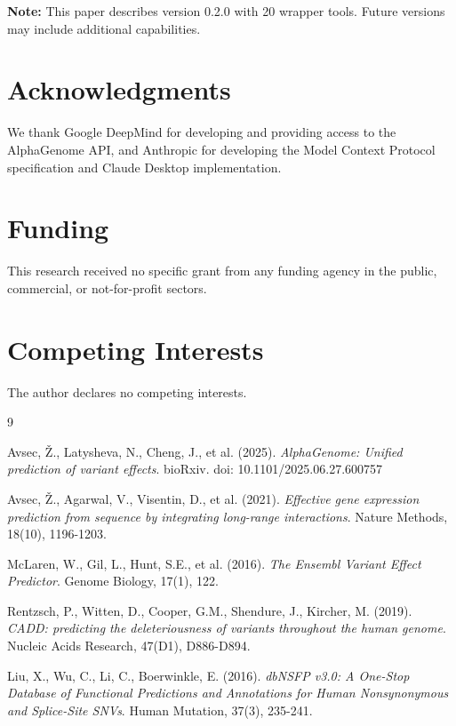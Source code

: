 \documentclass[11pt]{article}
\begin{document}
\textbf{Note:} This paper describes version 0.2.0 with 20 wrapper tools. Future versions may include additional capabilities.

\section*{Acknowledgments}

We thank Google DeepMind for developing and providing access to the AlphaGenome API, and Anthropic for developing the Model Context Protocol specification and Claude Desktop implementation.

\section*{Funding}

This research received no specific grant from any funding agency in the public, commercial, or not-for-profit sectors.

\section*{Competing Interests}

The author declares no competing interests.

\begin{thebibliography}{9}

Avsec, Ž., Latysheva, N., Cheng, J., et al. (2025).
\textit{AlphaGenome: Unified prediction of variant effects}.
bioRxiv. doi: 10.1101/2025.06.27.600757

Avsec, Ž., Agarwal, V., Visentin, D., et al. (2021).
\textit{Effective gene expression prediction from sequence by integrating long-range interactions}.
Nature Methods, 18(10), 1196-1203.

McLaren, W., Gil, L., Hunt, S.E., et al. (2016).
\textit{The Ensembl Variant Effect Predictor}.
Genome Biology, 17(1), 122.

Rentzsch, P., Witten, D., Cooper, G.M., Shendure, J., Kircher, M. (2019).
\textit{CADD: predicting the deleteriousness of variants throughout the human genome}.
Nucleic Acids Research, 47(D1), D886-D894.

Liu, X., Wu, C., Li, C., Boerwinkle, E. (2016).
\textit{dbNSFP v3.0: A One-Stop Database of Functional Predictions and Annotations for Human Nonsynonymous and Splice-Site SNVs}.
Human Mutation, 37(3), 235-241.

\end{thebibliography}
\end{document}
